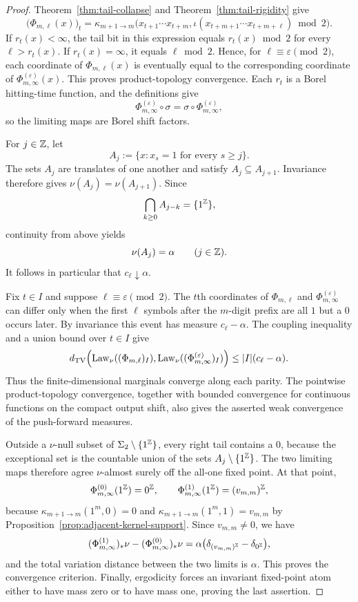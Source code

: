 \begin{proof}
Theorem~\ref{thm:tail-collapse} and
Theorem~\ref{thm:tail-rigidity} give
\[
\bigl(\Phi_{m,\ell}(x)\bigr)_t
=
\kappa_{m+1\to m}\bigl(x_{t+1}\cdots x_{t+m},
\iota(x_{t+m+1}\cdots x_{t+m+\ell})\bmod 2\bigr).
\]
If $r_t(x)<\infty$, the tail bit in this expression equals
$r_t(x)\bmod 2$ for every $\ell>r_t(x)$.  If $r_t(x)=\infty$, it equals
$\ell\bmod 2$.  Hence, for $\ell\equiv\varepsilon\pmod 2$, each coordinate
of $\Phi_{m,\ell}(x)$ is eventually equal to the corresponding coordinate of
$\Phi_{m,\infty}^{(\varepsilon)}(x)$.  This proves product-topology
convergence.  Each $r_t$ is a Borel hitting-time function, and the definitions
give
\[
\Phi_{m,\infty}^{(\varepsilon)}\circ\sigma
=\sigma\circ\Phi_{m,\infty}^{(\varepsilon)},
\]
so the limiting maps are Borel shift factors.

For $j\in\mathbb{Z}$, let
\[
A_j:=\{x:x_s=1\text{ for every }s\ge j\}.
\]
The sets $A_j$ are translates of one another and satisfy
$A_j\subseteq A_{j+1}$.  Invariance therefore gives
$\nu(A_j)=\nu(A_{j+1})$.  Since
\[
\bigcap_{k\ge 0}A_{j-k}=\{1^{\mathbb{Z}}\},
\]
continuity from above yields
\[
\nu(A_j)=\alpha\qquad(j\in\mathbb{Z}).
\]
It follows in particular that $c_\ell\downarrow\alpha$.

Fix $t\in I$ and suppose $\ell\equiv\varepsilon\pmod 2$.  The $t$th
coordinates of $\Phi_{m,\ell}$ and
$\Phi_{m,\infty}^{(\varepsilon)}$ can differ only when the first $\ell$
symbols after the $m$-digit prefix are all $1$ but a $0$ occurs later.  By
invariance this event has measure $c_\ell-\alpha$.  The coupling inequality
and a union bound over $t\in I$ give
\[
d_{\mathrm{TV}}\!\left(
\operatorname{Law}_\nu((\Phi_{m,\ell})_I),
\operatorname{Law}_\nu((\Phi_{m,\infty}^{(\varepsilon)})_I)
\right)
\le |I|(c_\ell-\alpha).
\]
Thus the finite-dimensional marginals converge along each parity.  The
pointwise product-topology convergence, together with bounded convergence for
continuous functions on the compact output shift, also gives the asserted
weak convergence of the push-forward measures.

Outside a $\nu$-null subset of $\Sigma_2\setminus\{1^{\mathbb{Z}}\}$, every right
tail contains a $0$, because the exceptional set is the countable union of
the sets $A_j\setminus\{1^{\mathbb{Z}}\}$.  The two limiting maps therefore agree
$\nu$-almost surely off the all-one fixed point.  At that point,
\[
\Phi_{m,\infty}^{(0)}(1^{\mathbb{Z}})=0^{\mathbb{Z}},
\qquad
\Phi_{m,\infty}^{(1)}(1^{\mathbb{Z}})=(v_{m,m})^{\mathbb{Z}},
\]
because $\kappa_{m+1\to m}(1^m,0)=0$ and
$\kappa_{m+1\to m}(1^m,1)=v_{m,m}$ by
Proposition~\ref{prop:adjacent-kernel-support}.  Since $v_{m,m}\ne0$, we have
\[
(\Phi_{m,\infty}^{(1)})_*\nu
-(\Phi_{m,\infty}^{(0)})_*\nu
=
\alpha\bigl(\delta_{(v_{m,m})^{\mathbb{Z}}}-\delta_{0^{\mathbb{Z}}}\bigr),
\]
and the total variation distance between the two limits is $\alpha$.  This
proves the convergence criterion.  Finally, ergodicity forces an invariant
fixed-point atom either to have mass zero or to have mass one, proving the
last assertion.
\end{proof}


